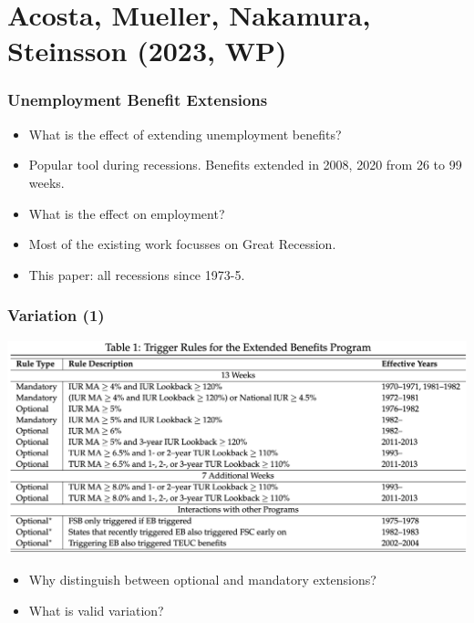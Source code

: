 \documentclass[english,xcolor=svgnames]{beamer}
\begin{document}
\section{Acosta, Mueller, Nakamura, Steinsson (2023, WP)}

\begin{frame}
	\frametitle[alignment=center]{Unemployment Benefit Extensions}
	\begin{itemize}
		\item What is the effect of extending unemployment benefits?
		\item Popular tool during recessions. Benefits extended in 2008, 2020 from 26 to 99 weeks.
		\item What is the effect on employment?
		\item Most of the existing work focusses on Great Recession.
		\item This paper: all recessions since 1973-5.
	\end{itemize}
\end{frame}

\begin{frame}
	\frametitle[alignment=center]{Variation (1)}
	\begin{center}
		\includegraphics[scale=0.3]{figures/AMNSTAB1.png}
	\end{center}
	\begin{itemize}
		\item Why distinguish between optional and mandatory extensions?
		\item What is valid variation?
	\end{itemize}
\end{frame}
\end{document}
